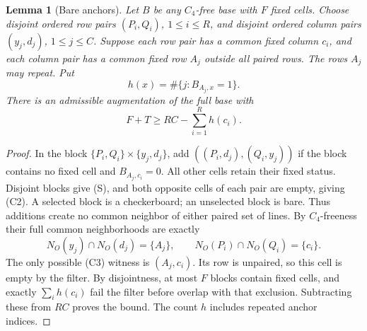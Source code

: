 \documentclass[11pt]{article}
\newtheorem{lemma}[theorem]{Lemma}
\begin{document}
\begin{lemma}[Bare anchors]\label{lem:bareanchors}
Let $B$ be any $C_4$-free base with $F$ fixed cells. Choose disjoint
ordered row pairs $(P_i,Q_i)$, $1\le i\le R$, and disjoint ordered
column pairs $(y_j,d_j)$, $1\le j\le C$. Suppose each row pair has a
common fixed column $c_i$, and each column pair has a common fixed row
$A_j$ outside all paired rows. The rows $A_j$ may repeat. Put
\[
 h(x)=\#\{j:B_{A_j,x}=1\}.
\]
There is an admissible augmentation of the full base with
\[
 F+T\ge RC-\sum_{i=1}^R h(c_i).
\]
\end{lemma}
\begin{proof}
In the block $\{P_i,Q_i\}\times\{y_j,d_j\}$, add
$((P_i,d_j),(Q_i,y_j))$ if the block contains no fixed cell and
$B_{A_j,c_i}=0$. All other cells retain their fixed status. Disjoint
blocks give (S), and both opposite cells of each pair are empty, giving
(C2). A selected block is a checkerboard; an unselected block is bare.
Thus additions create no common neighbor of either paired set of lines.
By $C_4$-freeness their full common neighborhoods are exactly
\[
 N_O(y_j)\cap N_O(d_j)=\{A_j\},\qquad
 N_O(P_i)\cap N_O(Q_i)=\{c_i\}.
\]
The only possible (C3) witness is $(A_j,c_i)$. Its row is unpaired,
so this cell is empty by the filter. By disjointness, at most $F$ blocks contain fixed
cells, and exactly $\sum_i h(c_i)$ fail the filter before overlap with
that exclusion. Subtracting these from $RC$ proves the bound. The count
$h$ includes repeated anchor indices.
\end{proof}
\end{document}
